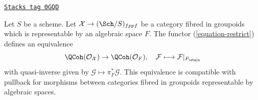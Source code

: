 \begin{lemma}
\label{stacks-sheaves-lemma-compare-quasi-coherent}
\href{https://stacks.math.columbia.edu/tag/0GQD}{\texttt{Stacks tag 0GQD}}

Let $S$ be a scheme. Let $\mathcal{X} \to (\Sch/S)_{fppf}$ be a category
fibred in groupoids which is representable by an algebraic space $F$.
The functor (\ref{equation-restrict}) defines an equivalence
$$
\QCoh(\mathcal{O}_\mathcal{X}) \to \QCoh(\mathcal{O}_F),\quad
\mathcal{F} \longmapsto \mathcal{F}|_{F_\etale}
$$
with quasi-inverse given by $\mathcal{G} \mapsto \pi_F^*\mathcal{G}$.
This equivalence is compatible with pullback for morphisms between
categories fibred in groupoids representable by algebraic spaces.
\end{lemma}

